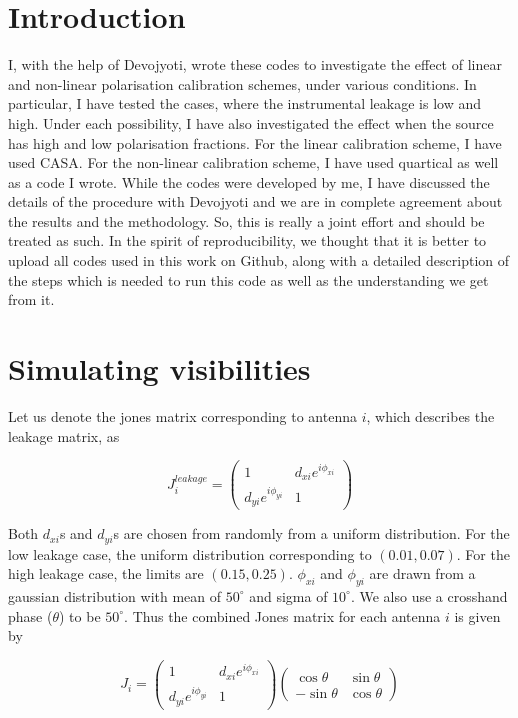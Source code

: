 \documentclass{article}
\begin{document}
\section{Introduction}

I, with the help of Devojyoti, wrote these codes to investigate the effect of linear and non-linear polarisation calibration schemes, under various conditions. In particular, I have tested the cases, where the instrumental leakage is low and high. Under each possibility, I have also investigated the effect when the source has high and low polarisation fractions. For the linear calibration scheme, I have used CASA. For the non-linear calibration scheme, I have used quartical as well as a code I wrote. While the codes were developed by me, I have discussed the details of the procedure with Devojyoti and we are in complete agreement about the results and the methodology. So, this is really a joint effort and should be treated as such. In the spirit of reproducibility, we thought that it is better to upload all codes used in this work on Github, along with a detailed description of the steps which is needed to run this code as well as the understanding we get from it.


\section{Simulating visibilities}

Let us denote the jones matrix corresponding to antenna $i$, which describes the leakage matrix, as 

\begin{equation}
J^{leakage}_i=
\begin{pmatrix}
1 & d_{xi}e^{i\phi_{xi}} \\
d_{yi}e^{i\phi_{yi}} & 1
\end{pmatrix}
\end{equation}

Both $d_{xi}$s and $d_{yi}$s are chosen from randomly from a uniform distribution. For the low leakage case, the uniform distribution corresponding to $(0.01,0.07)$. For the high leakage case, the limits are $(0.15,0.25)$. $\phi_{xi}$ and $\phi_{yi}$ are drawn from a gaussian distribution with mean of $50^\circ$ and sigma of $10^\circ$. We also use a crosshand phase ($\theta$) to be $50^\circ$. Thus the combined Jones matrix for each antenna $i$ is given by

\begin{equation}
J_i=\begin{pmatrix}
1 & d_{xi}e^{i\phi_{xi}} \\
d_{yi}e^{i\phi_{yi}} & 1
\end{pmatrix} 
\begin{pmatrix}
\cos \theta & \sin \theta\\
-\sin \theta & \cos \theta
\end{pmatrix}
\end{equation}
\end{document}
